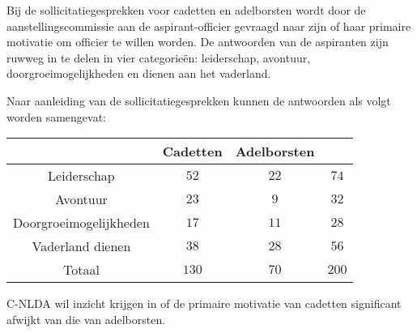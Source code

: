\begin{question}{20}{
    Bij de sollicitatiegesprekken voor cadetten en adelborsten wordt door de aanstellingscommissie aan de aspirant-officier gevraagd naar zijn of haar primaire motivatie om officier te willen worden.
    De antwoorden van de aspiranten zijn ruwweg in te delen in vier categorie\"en: leiderschap, avontuur, doorgroeimogelijkheden en dienen aan het vaderland.
    
    Naar aanleiding van de sollicitatiegesprekken kunnen de antwoorden als volgt worden samengevat:

    \begin{center}
        \renewcommand{\arraystretch}{1.25}
        \begin{tabular}{c|cc|c}
            \toprule
                & Cadetten & Adelborsten & \\
            \midrule
                Leiderschap & $52$ & $22$ & $74$ \\
                Avontuur & $23$ & $9$ & $32$ \\
                Doorgroeimogelijkheden & $17$ & $11$ & $28$ \\
                Vaderland dienen & $38$ & $28$ & $56$ \\
            \midrule
                Totaal      & $130$ & $70$ & $200$ \\
            \bottomrule
        \end{tabular}
    \end{center}
    C-NLDA wil inzicht krijgen in of de primaire motivatie van cadetten significant afwijkt van die van adelborsten.
}



\end{question}
